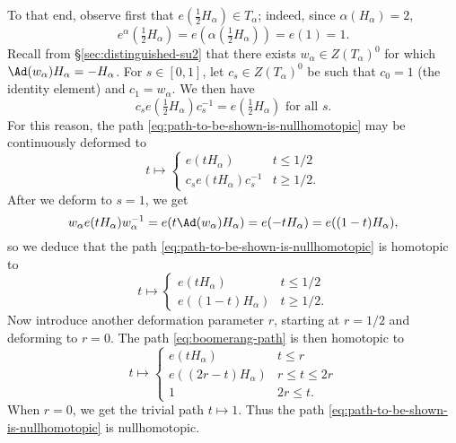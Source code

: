 \documentclass[reqno]{amsart} 
\begin{document}
To that end, observe first that $e(\tfrac{1}{2} H_\alpha) \in T_\alpha$; indeed, since $\alpha(H_\alpha) = 2$,
\begin{equation*}
  e^\alpha(\tfrac{1}{2} H_\alpha) = e(\alpha(\tfrac{1}{2} H_\alpha)) = e(1) = 1.
\end{equation*}
Recall from \S\ref{sec:distinguished-su2} that there exists $w_\alpha \in Z(T_\alpha)^0$ for which $\Ad(w_\alpha) H_\alpha = - H_\alpha$.  For $s \in [0,1]$, let $c_s \in Z(T_\alpha)^0$ be such that $c_0 = 1$ (the identity element) and $c_1 = w_\alpha$.  We then have
\begin{equation*}
  c_s e(\tfrac{1}{2} H_\alpha) c_s^{-1} = e(\tfrac{1}{2} H_\alpha) \text{ for all } s.
\end{equation*}
For this reason, the path \eqref{eq:path-to-be-shown-is-nullhomotopic} may be continuously deformed to
\begin{equation*}
  t \mapsto
  \begin{cases}
    e(t H_\alpha) &  t \leq 1/2 \\
    c_s e(t H_\alpha) c_s^{-1} & t \geq 1/2.
  \end{cases}
\end{equation*}
After we deform to $s = 1$, we get
\begin{equation*}
  w_\alpha e(t H_\alpha) w_\alpha^{-1} = e( t \Ad(w_\alpha)H_\alpha) = e(-t H_\alpha) = e((1-t) H_\alpha),
\end{equation*}
so we deduce that the path \eqref{eq:path-to-be-shown-is-nullhomotopic} is homotopic to
\begin{equation}\label{eq:boomerang-path}
  t \mapsto
  \begin{cases}
    e(t H_\alpha) &  t \leq 1/2 \\
    e((1-t) H_\alpha)  & t \geq 1/2.
  \end{cases}
\end{equation}
Now introduce another deformation parameter $r$, starting at $r=1/2$ and deforming to $r=0$.  The path \eqref{eq:boomerang-path} is then homotopic to
\begin{equation}\label{eq:boomerang-path-2}
  t \mapsto
  \begin{cases}
    e(t H_\alpha) &  t \leq r \\
    e((2r-t) H_\alpha)  & r \leq t \leq 2 r \\
    1 & 2 r \leq t.
  \end{cases}
\end{equation}
When $r = 0$, we get the trivial path $t \mapsto 1$.  Thus the path \eqref{eq:path-to-be-shown-is-nullhomotopic} is nullhomotopic.
\end{document}

